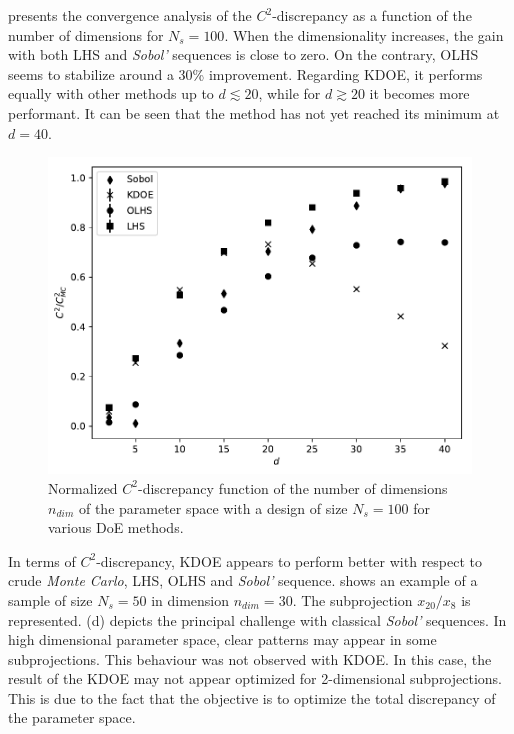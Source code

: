 \newpage


 presents the convergence analysis of the $C^2$-discrepancy as a function of the number of dimensions for $N_s = 100$. When the dimensionality increases, the gain with both LHS and \emph{Sobol'} sequences is close to zero. On the contrary, OLHS seems to stabilize around a 30\% improvement. Regarding KDOE, it performs equally with other methods up to $d \lesssim 20$, while for $d \gtrsim 20$ it becomes more performant. It can be seen that the method has not yet reached its minimum at $d = 40$.

\begin{figure}[!ht]
\centering
\includegraphics[width=0.9\linewidth,keepaspectratio]{fig/contributions/doe/kde_dim.pdf}
\caption{Normalized $C^2$-discrepancy function of the number of dimensions $n_{dim}$ of the parameter space with a design of size $N_s = 100$ for various DoE methods.}
\label{fig:conv-dim-100}
\end{figure}

In terms of $C^2$-discrepancy, KDOE appears to perform better with respect to crude \emph{Monte Carlo}, LHS, OLHS and \emph{Sobol'} sequence.  shows an example of a sample of size $N_s = 50$ in dimension $n_{dim}=30$. The subprojection $x_{20}/x_8$ is represented. (d) depicts the principal challenge with classical \emph{Sobol'} sequences. In high dimensional parameter space, clear patterns may appear in some subprojections. This behaviour was not observed with KDOE. In this case, the result of the KDOE may not appear optimized for 2-dimensional subprojections. This is due to the fact that the objective is to optimize the total discrepancy of the parameter space.

